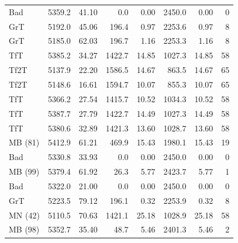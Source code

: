 \documentclass[journal,a4paper,10pt,twoside]{IEEEtran} %
\begin{document}
\begin{table}[ht]
\begin{tabular}{lrrrrrrr}
    	     Bad &   5359.2 & 41.10 &      0.0 &  0.00 &   2450.0 &  0.00 &     0 \\
    	     GrT &   5192.0 & 45.06 &    196.4 &  0.97 &   2253.6 &  0.97 &     8 \\
    	     GrT &   5185.0 & 62.03 &    196.7 &  1.16 &   2253.3 &  1.16 &     8 \\
    	     TfT &   5385.2 & 34.27 &   1422.7 & 14.85 &   1027.3 & 14.85 &    58 \\
    	    Tf2T &   5137.9 & 22.20 &   1586.5 & 14.67 &    863.5 & 14.67 &    65 \\
    	    Tf2T &   5148.6 & 16.61 &   1594.7 & 10.07 &    855.3 & 10.07 &    65 \\
    	     TfT &   5366.2 & 27.54 &   1415.7 & 10.52 &   1034.3 & 10.52 &    58 \\
    	     TfT &   5387.7 & 27.79 &   1422.7 & 14.49 &   1027.3 & 14.49 &    58 \\
    	     TfT &   5380.6 & 32.89 &   1421.3 & 13.60 &   1028.7 & 13.60 &    58 \\
    	 MB (81) &   5412.9 & 61.21 &    469.9 & 15.43 &   1980.1 & 15.43 &    19 \\
    	     Bad &   5330.8 & 33.93 &      0.0 &  0.00 &   2450.0 &  0.00 &     0 \\
    	 MB (99) &   5379.4 & 61.92 &     26.3 &  5.77 &   2423.7 &  5.77 &     1 \\
    	     Bad &   5322.0 & 21.00 &      0.0 &  0.00 &   2450.0 &  0.00 &     0 \\
    	     GrT &   5223.5 & 79.12 &    196.1 &  0.32 &   2253.9 &  0.32 &     8 \\
    	 MN (42) &   5110.5 & 70.63 &   1421.1 & 25.18 &   1028.9 & 25.18 &    58 \\
    	 MB (98) &   5352.7 & 35.40 &     48.7 &  5.46 &   2401.3 &  5.46 &     2 \\ \bottomrule
    \end{tabular}
\end{table}
\end{document}
